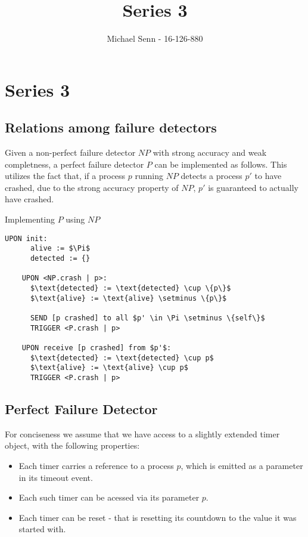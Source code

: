 \documentclass[a4paper]{scrreprt}
\title{Series 3}
\author{Michael Senn \maillink{michael.senn@students.unibe.ch} - 16-126-880}
\date{\printdate}
\begin{document}
\maketitle


\setcounter{chapter}{2}

\chapter{Series 3}

\section{Relations among failure detectors}

Given a non-perfect failure detector $NP$ with strong accuracy and weak
completness, a perfect failure detector $P$ can be implemented as follows. This
utilizes the fact that, if a process $p$ running $NP$ detects a process $p'$ to
have crashed, due to the strong accuracy property of $NP$, $p'$ is guaranteed
to actually have crashed.

\begin{library}{Implementing $P$ using $NP$}
  \begin{lstlisting}[mathescape=true,autogobble=true,breaklines=true]
    UPON init:
      alive := $\Pi$
      detected := {}

    UPON <NP.crash | p>:
      $\text{detected} := \text{detected} \cup \{p\}$
      $\text{alive} := \text{alive} \setminus \{p\}$

      SEND [p crashed] to all $p' \in \Pi \setminus \{self\}$
      TRIGGER <P.crash | p>

    UPON receive [p crashed] from $p'$:
      $\text{detected} := \text{detected} \cup p$
      $\text{alive} := \text{alive} \cup p$
      TRIGGER <P.crash | p>
  \end{lstlisting}
\end{library}

\section{Perfect Failure Detector}

For conciseness we assume that we have access to a slightly extended timer
object, with the following properties:
\begin{itemize}
  \item Each timer carries a reference to a process $p$, which is emitted as a
    parameter in its timeout event.
  \item Each such timer can be acessed via its parameter $p$.
  \item Each timer can be reset - that is resetting its countdown to the value
    it was started with.
\end{itemize}
\end{document}
